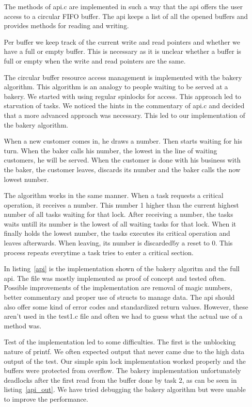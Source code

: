 \begin{homeworkProblem}
\label{sec:circ_buf}
The methods of api.c are implemented in such a way that the api offers the user access to a circular FIFO buffer. The api keeps a list of all the opened buffers and provides methods for reading and writing.

Per buffer we keep track of the current write and read pointers and whether we have a full or empty buffer. This is necessary as it is unclear whether a buffer is full or empty when the write and read pointers are the same.

The circular buffer resource access management is implemented with the bakery algorithm. This algorithm is an analogy to people waiting to be served at a bakery. We started with using regular spinlocks for access. This approach led to starvation of tasks. We noticed the hints in the commentary of api.c and decided that a more advanced approach was necessary. This led to our implementation of the bakery algorithm.

When a new customer comes in, he draws a number.
Then starts waiting for his turn. When the baker calls his number, the lowest in the line of waiting customers, he will be served. 
When the customer is done with his business with the baker, the customer leaves, discards its number and the baker calls the now lowest number. 

The algorithm works in the same manner. When a task requests a critical operation, it receives a number. This number 1 higher than the current highest number of all tasks waiting for that lock. 
After receiving a number, the tasks waits untill its number is the lowest of all waiting tasks for that lock. 
When it finally holds the lowest number, the tasks executes its critical operation and leaves afterwards. When leaving, its number is \'discarded\' by a reset to 0. 
This process repeats everytime a task tries to enter a critical section.

In listing~\ref{api} is the implementation shown of the bakery algoritm and the full api. The file was mostly implemented as proof of concept and tested often. Possible improvements of the implementation are removal of magic numbers, better commentary and proper use of structs to manage data. The api should also offer some kind of error codes and standardized return values. However, these aren't used in the test1.c file and often we had to guess what the actual use of a method was. 

Test of the implementation led to some difficulties. The first is the unblocking nature of printf. We often expected output that never came due to the high data output of the test. Our simple spin lock implementation worked properly and the buffers were protected from overflow. The bakery implementation unfortunately deadlocks after the first read from the buffer done by task 2, as can be seen in listing~\ref{api_out}. We have tried debugging the bakery algorithm but were unable to improve the performance.


\newpage


\end{homeworkProblem}